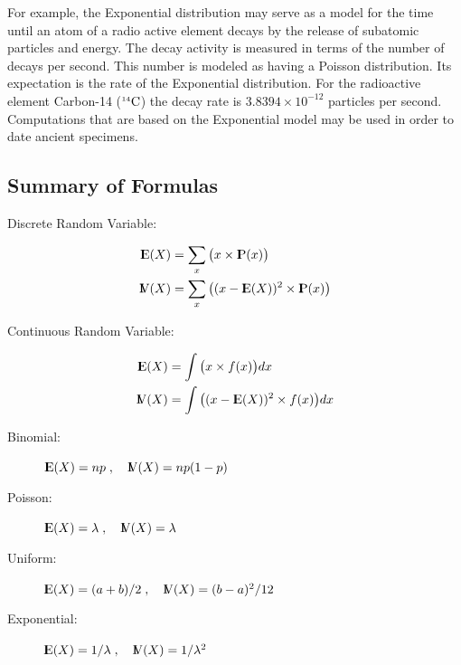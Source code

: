 \documentclass[]{krantz}
\newcommand{\Expec}{{\rm I\kern-.3em E}}
\newcommand{\Prob}{{\rm I\kern-.3em P}}
\newcommand{\Var}{{\rm I\kern-.3em V}}
\theoremstyle{definition}
\theoremstyle{definition}
\theoremstyle{definition}
\theoremstyle{remark}
\begin{document}
For example, the Exponential distribution may serve as a model for the
time until an atom of a radio active element decays by the release of
subatomic particles and energy. The decay activity is measured in terms
of the number of decays per second. This number is modeled as having a
Poisson distribution. Its expectation is the rate of the Exponential
distribution. For the radioactive element Carbon-14
(\({}^{\mbox{\tiny 14}}\mathrm{C}\)) the decay rate is
\(3.8394 \times 10^{-12}\) particles per second. Computations that are
based on the Exponential model may be used in order to date ancient
specimens.

\subsection*{Summary of Formulas}\label{summary-of-formulas}


\begin{description}
\item[Discrete Random Variable:]
\end{description}

\[\begin{aligned}
        \Expec(X) &= \sum_x \big(x \times \Prob(x)\big) \\
        \Var(X) &= \sum_x\big( (x-\Expec(X))^2 \times \Prob(x)\big) \end{aligned}\]

\begin{description}
\item[Continuous Random Variable:]
\end{description}

\[\begin{aligned}
        \Expec(X) &= \int \big(x \times f(x)\big)dx \\
        \Var(X) &= \int\big((x-\Expec(X))^2 \times f(x) \big) dx \end{aligned}\]

\begin{description}
\item[Binomial:]
\(\Expec(X) = n p \;, \quad \Var(X) = n p(1-p)\)
\item[Poisson:]
\(\Expec(X) = \lambda\;, \quad \Var(X) = \lambda\)
\item[Uniform:]
\(\Expec(X) = (a+b)/2\;, \quad \Var(X)= (b-a)^2/12\)
\item[Exponential:]
\(\Expec(X) = 1/\lambda\;, \quad \Var(X)= 1/\lambda^2\)
\end{description}
\end{document}
